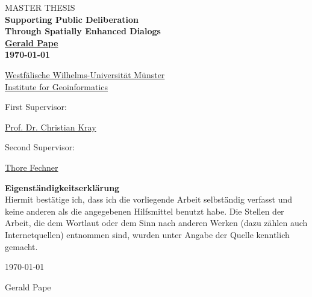 \onecolumn

\thispagestyle{empty}

\begin{center}
 
\vspace*{5cm}

\textsc{\large MASTER THESIS}\\[1cm]


{ \Huge \textbf{Supporting Public Deliberation}}\\[0.2cm]
{ \Huge \textbf{Through Spatially Enhanced Dialogs}}\\[2.5cm]
 
{\LARGE \textbf{\href{mailto:g.pape@uni-muenster.de}{Gerald Pape}}}\\[1.5cm]
 
{\LARGE \textbf{\today}}\\[5cm]

\end{center}

{\Large
\href{https://www.uni-muenster.de}{Westf{\"a}lische Wilhelms-Universit{\"a}t M{\"u}nster}\\[0.3cm]
\href{http://www.ifgi.de}{Institute for Geoinformatics}\\[0.7cm]

\parbox{4.5cm}{First Supervisor:} \href{mailto:c.kray@uni-muenster.de}{Prof. Dr. Christian Kray}\\[0.3cm]
\parbox{4.5cm}{Second Supervisor:} \href{mailto:t.fechner@uni-muenster.de}{Thore Fechner}
}

\vfill

\newpage

\thispagestyle{empty}

{ \LARGE \textbf{Eigenständigkeitserklärung}}\\[0.2cm]

Hiermit bestätige ich, dass ich die vorliegende Arbeit selbständig verfasst und keine anderen als die angegebenen Hilfsmittel benutzt habe. Die Stellen der Arbeit, die dem Wortlaut oder dem Sinn nach anderen Werken (dazu zählen auch Internetquellen) entnommen sind, wurden unter Angabe der Quelle kenntlich gemacht.

\par
\vspace*{10ex}
\noindent
\begin{minipage}[b][][t]{0.4\textwidth}
	\today
\end{minipage}
\hfill
\begin{minipage}[b][][b]{0.4\textwidth}
	\hrulefill
\end{minipage}

\par
\vspace*{-1ex}
\noindent
\hfill
\begin{minipage}{0.4\textwidth}
	\centering
	\vspace*{1ex}
	Gerald Pape
\end{minipage}


\twocolumn
